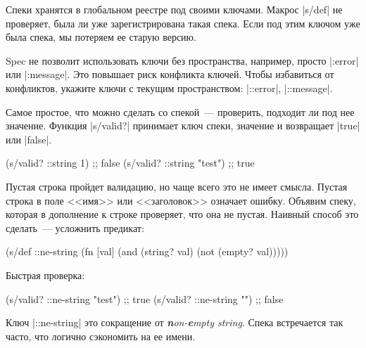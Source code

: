 \begin{english}
\end{english}

Спеки хранятся в глобальном реестре под своими ключами. Макрос \spverb|s/def| не
проверяет, была ли уже зарегистрирована такая спека. Если под этим ключом уже
была спека, мы потеряем ее старую версию.

Spec не позволит использовать ключи без пространства, например, просто
\spverb|:error| или \spverb|:message|. Это повышает риск конфликта ключей. Чтобы
избавиться от конфликтов, укажите ключи с текущим пространством:
\spverb|::error|, \spverb|::message|.

Самое простое, что можно сделать со спекой~--- проверить, подходит ли под нее
значение. Функция \spverb|s/valid?| принимает ключ спеки, значение и возвращает
\spverb|true| или \spverb|false|.

\begin{english}
  \begin{clojure}
(s/valid? ::string 1)      ;; false
(s/valid? ::string "test") ;; true
  \end{clojure}
\end{english}

Пустая строка пройдет валидацию, но чаще всего это не имеет смысла. Пустая
строка в поле <<имя>> или <<заголовок>> означает ошибку. Объявим спеку, которая
в дополнение к строке проверяет, что она не пустая. Наивный способ это
сделать~--- усложнить предикат:

\begin{english}
  \begin{clojure}
(s/def ::ne-string
  (fn [val]
    (and (string? val)
         (not (empty? val)))))
  \end{clojure}
\end{english}

\noindent
Быстрая проверка:

\begin{english}
  \begin{clojure}
(s/valid? ::ne-string "test") ;; true
(s/valid? ::ne-string "")     ;; false
  \end{clojure}
\end{english}

Ключ \spverb|::ne-string| это сокращение от \emph{\textbf{n}on-\textbf{e}mpty string}.
Спека встречается так часто, что логично сэкономить на ее имени.

